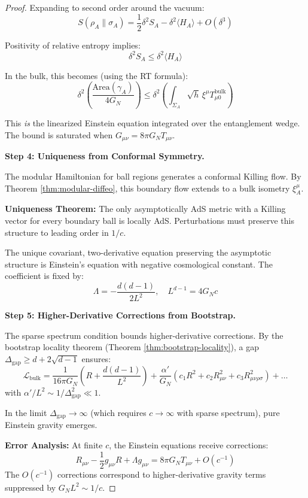 \documentclass[12pt,a4paper]{article}
\begin{document}
\begin{proof}
Expanding to second order around the vacuum:
\begin{equation}
S(\rho_A \| \sigma_A) = \frac{1}{2}\delta^2 S_A - \delta^2 \langle H_A \rangle + O(\delta^3)
\end{equation}

Positivity of relative entropy implies:
\begin{equation}
\delta^2 S_A \leq \delta^2 \langle H_A \rangle
\end{equation}

In the bulk, this becomes (using the RT formula):
\begin{equation}
\delta^2 \left( \frac{\text{Area}(\gamma_A)}{4G_N} \right) \leq \delta^2 \left( \int_{\Sigma_A} \sqrt{h} \, \xi^\mu T_{\mu 0}^{\text{bulk}} \right)
\end{equation}

This \emph{is} the linearized Einstein equation integrated over the entanglement wedge. The bound is saturated when $G_{\mu\nu} = 8\pi G_N T_{\mu\nu}$.

\textbf{Step 4: Uniqueness from Conformal Symmetry.}

The modular Hamiltonian for ball regions generates a conformal Killing flow. By Theorem \ref{thm:modular-diffeo}, this boundary flow extends to a bulk isometry $\xi_A^\mu$.

\textbf{Uniqueness Theorem:} The only asymptotically AdS metric with a Killing vector for every boundary ball is locally AdS. Perturbations must preserve this structure to leading order in $1/c$.

The unique covariant, two-derivative equation preserving the asymptotic structure is Einstein's equation with negative cosmological constant. The coefficient is fixed by:
\begin{equation}
\Lambda = -\frac{d(d-1)}{2L^2}, \quad L^{d-1} = 4G_N c
\end{equation}

\textbf{Step 5: Higher-Derivative Corrections from Bootstrap.}

The sparse spectrum condition bounds higher-derivative corrections. By the bootstrap locality theorem (Theorem \ref{thm:bootstrap-locality}), a gap $\Delta_{\text{gap}} \geq d + 2\sqrt{d-1}$ ensures:
\begin{equation}
\mathcal{L}_{\text{bulk}} = \frac{1}{16\pi G_N}\left( R + \frac{d(d-1)}{L^2} \right) + \frac{\alpha'}{G_N}\left( c_1 R^2 + c_2 R_{\mu\nu}^2 + c_3 R_{\mu\nu\rho\sigma}^2 \right) + \ldots
\end{equation}
with $\alpha'/L^2 \sim 1/\Delta_{\text{gap}}^2 \ll 1$.

In the limit $\Delta_{\text{gap}} \to \infty$ (which requires $c \to \infty$ with sparse spectrum), pure Einstein gravity emerges.

\textbf{Error Analysis:}
At finite $c$, the Einstein equations receive corrections:
\begin{equation}
R_{\mu\nu} - \frac{1}{2}g_{\mu\nu}R + \Lambda g_{\mu\nu} = 8\pi G_N T_{\mu\nu} + O(c^{-1})
\end{equation}
The $O(c^{-1})$ corrections correspond to higher-derivative gravity terms suppressed by $G_N L^2 \sim 1/c$.
\end{proof}
\end{document}

